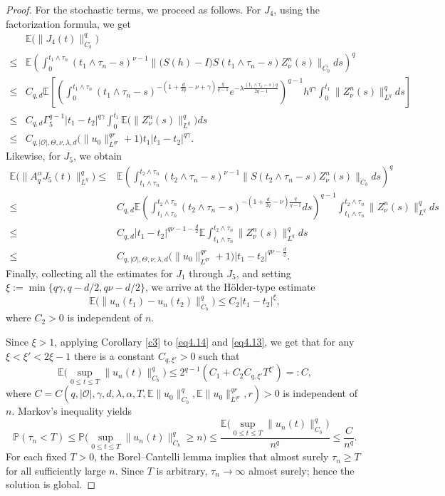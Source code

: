 \documentclass[10pt]{article}
\numberwithin{figure}{section}
\numberwithin{equation}{section}
\newcommand{\0}{{\theta}}
\def\be{\begin{equation}}
\def\ee{\end{equation}}
\def\lam{\lambda}
\def\gam{\gamma}
\def\a{\alpha}
\def\E{\mathbb{E}}
\def\[{\left[}\def\]{\right]}
\def\({\left(}\def\){\right)}
\begin{document}
\begin{proof}
For the stochastic terms, we proceed as follows. For $J_4$, using the factorization formula, we get
\begin{equation*}
\begin{split}
&\mathbb{E}\big(\|J_4(t)\|_{C_b}^q\big)\\
 \le & \E\(\int_0^{t_1\wedge\tau_n}(t_1\wedge\tau_n-s)^{\nu-1}\|\big(S(h)-I\big)S(t_1\wedge\tau_n-s)Z_\nu^n(s)\|_{C_b}ds\)^q\\
\le&C_{q,d}\E\[\(\int_0^{t_1\wedge\tau_n}(t_1\wedge\tau_n-s)^{-(1+\frac{d}{2q}-\nu+\gam)\frac{q}{q-1}}e^{-\lam\frac{(t_1\wedge\tau_n-s)q}{2{q-1}}}\)^{q-1}h^{q\gam}\int_0^{t_1}\|Z_\nu^n(s)\|_{L^q}^qds\]\\
\le&C_{q,d}\Gamma_5^{q-1}|t_1-t_2|^{q\gam}\int_0^{t_1}\E\big(\|Z_\nu^n(s)\|_{L^q}^q\big)ds\\
\le&C_{q,|\mathcal O|,\Theta,\nu,\lam,d}\big(\|u_0\|_{L^{qr}}^{qr}+1\big)t_1|t_1-t_2|^{q\gam}.
\end{split}
\end{equation*}
Likewise, for $J_5$, we obtain
\begin{equation*}
\begin{split}
\mathbb{E}\big(\|A_q^\a J_5(t) \|_{L^q}^q\big) \le
 & \E\(\int_{t_1\wedge\tau_n}^{t_2\wedge\tau_n}(t_2\wedge\tau_n-s)^{\nu-1}\|S(t_2\wedge\tau_n-s)Z_\nu^n(s)\|_{C_b}ds\)^q\\
\le&C_{q,d}\E\(\int_{t_1\wedge\tau_n}^{t_2\wedge\tau_n}(t_2\wedge\tau_n-s)^{-(1+\frac{d}{2q}-\nu)\frac{q}{q-1}}ds\)^{q-1}\int_{t_1\wedge\tau_n}^{t_2\wedge\tau_n}\|Z_\nu^n(s)\|_{L^q}^qds\\
\le&C_{q,d}|t_1-t_2|^{q\nu-1-\frac{d}{2}}\E\int_{t_1\wedge\tau_n}^{t_2\wedge\tau_n}\|Z_\nu^n(s)\|_{L^q}^qds\\
\le&C_{q,|\mathcal O|,\Theta,\nu,\lam,d}\big(\|u_0\|_{L^{qr}}^{qr}+1\big)|t_1-t_2|^{q\nu-\frac{d}{2}}.
\end{split}
\end{equation*}
\vs
Finally, collecting all the estimates for $J_1$ through $J_5$, and setting $\xi:=\min\{q\gam,q-d/2,q\nu-d/2\}$, we arrive at the H\"older-type estimate
\be\label{eq4.13}\E\big(\|u_n(t_1)-u_n(t_2)\|_{C_b}^q\big)\le C_2|t_1-t_2|^\xi,\ee
where $C_2>0$ is independent of $n$. 


Since $\xi > 1$, applying Corollary \ref{c3} to \eqref{eq4.14} and \eqref{eq4.13}, we get that for any $\xi < \xi' < 2\xi - 1$ there is a constant $C_{q,\xi'} > 0$ such that 
$$
\mathbb{E}\big(\sup_{0\le t\le T}\|u_n(t)\|_{C_b}^q\big)
\le 2^{q-1}(C_1 + C_2 C_{q,\xi'} T^{\xi'})=:C,
$$
where $C = C(q,|\mathcal{O}|,\gamma, d, \lam,\alpha,T,\mathbb{E}\| u_0 \|_{C_b}^q,\mathbb{E}\| u_0 \|_{L^{qr}}^{qr},r)>0$ is  independent of $n$.
\vs
Markov's inequality yields
$$
\mathbb{P}(\tau_n < T) \le \mathbb{P}\!\Big( \sup_{0 \le t \le T} \| u_n(t) \|_{C_b}^q \ge n \Big)
                     \le \frac{\mathbb{E}\!\Big( \sup_{0 \le t \le T} \| u_n(t) \|_{C_b}^q \Big)}{n^q}
                     \le \frac{C}{n^q}.
$$
For each fixed $T > 0$, the Borel--Cantelli lemma implies that almost surely
$\tau_n \ge T$ for all sufficiently large $n$.  
Since $T$ is arbitrary, $\tau_n \to \infty$ almost surely; hence the solution is global.\end{proof}
\end{document}
